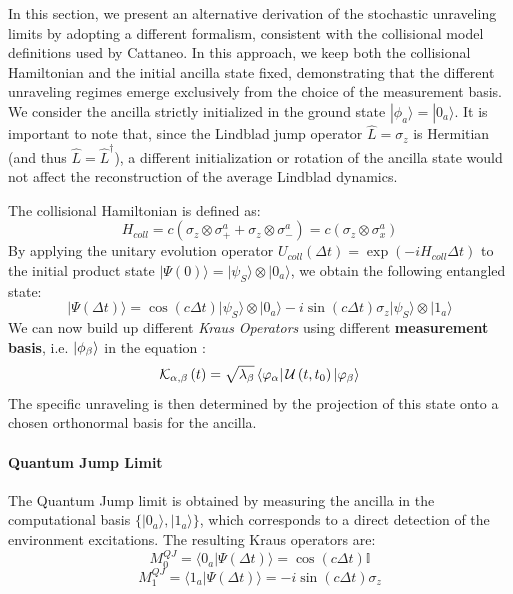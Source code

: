 \documentclass[a4paper,12pt]{article}
\begin{document}
In this section, we present an alternative derivation of the stochastic unraveling limits by adopting a different formalism, consistent with the collisional model definitions used by Cattaneo\cite{cattaneoCollisionModelsCan2021}. In this approach, we keep both the collisional Hamiltonian and the initial ancilla state fixed, demonstrating that the different unraveling regimes emerge exclusively from the choice of the measurement basis. We consider the ancilla strictly initialized in the ground state $|\phi_a\rangle = |0_a\rangle$. It is important to note that, since the Lindblad jump operator $\hat{L} = \sigma_z$ is Hermitian (and thus $\hat{L} = \hat{L}^\dagger$), a different initialization or rotation of the ancilla state would not affect the reconstruction of the average Lindblad dynamics.

The collisional Hamiltonian is defined as:
\begin{equation}
	H_{coll} = c (\sigma_z \otimes \sigma_+^a + \sigma_z \otimes \sigma_-^a) = c (\sigma_z \otimes \sigma_x^a)
\end{equation}
By applying the unitary evolution operator $U_{coll}(\Delta t) = \exp(-i H_{coll} \Delta t)$ to the initial product state $|\Psi(0)\rangle = |\psi_S\rangle \otimes |0_a\rangle$, we obtain the following entangled state:
\begin{equation}
	|\Psi(\Delta t)\rangle = \cos(c\Delta t) |\psi_S\rangle \otimes |0_a\rangle - i \sin(c\Delta t) \sigma_z |\psi_S\rangle \otimes |1_a\rangle
\end{equation}
We can now build up different \textit{Kraus Operators} using different \textbf{measurement basis}, i.e. $ \ket{\phi_{\beta}} $ in the equation : 
\begin{equation}
	\mathcal{K}_{\alpha, \beta} \left(t\right) = \sqrt{\lambda_{\beta}} \bra{\varphi_{\alpha}}  \mathcal{U}\left(t, t_0\right) \ket{\varphi_{\beta}}
\end{equation}
The specific unraveling is then determined by the projection of this state onto a chosen orthonormal basis for the ancilla.

\paragraph{Quantum Jump Limit}
The Quantum Jump limit is obtained by measuring the ancilla in the computational basis $\{|0_a\rangle, |1_a\rangle\}$, which corresponds to a direct detection of the environment excitations. The resulting Kraus operators are:
\begin{equation}
	M_0^{QJ} = \langle 0_a | \Psi(\Delta t) \rangle = \cos(c\Delta t) \mathbb{I}
\end{equation}
\begin{equation}
	M_1^{QJ} = \langle 1_a | \Psi(\Delta t) \rangle = -i \sin(c\Delta t) \sigma_z
\end{equation}
\end{document}

